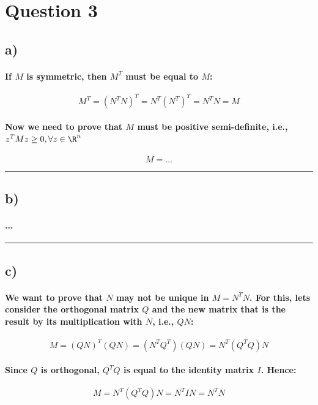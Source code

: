\documentclass[a4paper]{article}    %
\begin{document}
\section*{Question 3}

\subsection*{a)}

\paragraph{If $M$ is symmetric, then $M^T$ must be equal to $M$:}
    \[M^T = (N^TN)^T = N^T(N^T)^T = N^TN = M\]
\paragraph{Now we need to prove that $M$ must be positive semi-definite, i.e., $z^TMz \geq 0, \forall z \in \R^n$}
    \[M = ...\]

\hrule

\subsection*{b)}

\paragraph{...}

\hrule

\subsection*{c)}

\paragraph{We want to prove that $N$ may not be unique in $M=N^TN$. For this, lets consider the orthogonal matrix $Q$ and the new matrix that is the result by its multiplication with $N$, i.e., $QN$:}
    \[M = (QN)^T(QN) = (N^TQ^T)(QN) = N^T(Q^TQ)N\]

\paragraph{Since $Q$ is orthogonal, $Q^TQ$ is equal to the identity matrix $I$. Hence:}
    \[M= N^T(Q^TQ)N = N^TIN = N^TN\]
\end{document}
